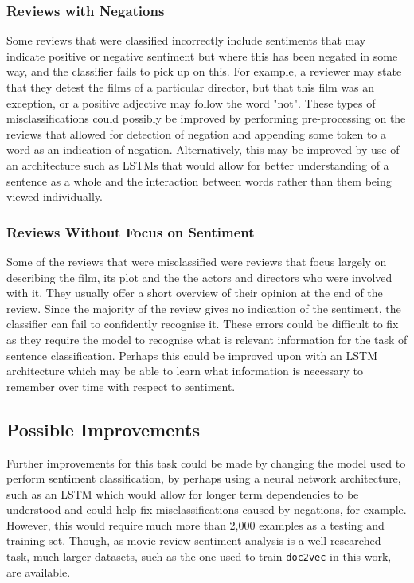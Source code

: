 \documentclass[twocolumn]{article}
\begin{document}
\subsubsection{Reviews with Negations}

Some reviews that were classified incorrectly include sentiments that may indicate positive or negative sentiment but where this has been negated in some way, and the classifier fails to pick up on this. For example, a reviewer may state that they detest the films of a particular director, but that this film was an exception, or a positive adjective may follow the word "not". These types of misclassifications could possibly be improved by performing pre-processing on the reviews that allowed for detection of negation and appending some token to a word as an indication of negation. Alternatively, this may be improved by use of an architecture such as LSTMs that would allow for better understanding of a sentence as a whole and the interaction between words rather than them being viewed individually. 

\subsubsection{Reviews Without Focus on Sentiment}

Some of the reviews that were misclassified were reviews that focus largely on describing the film, its plot and the the actors and directors who were involved with it. They usually offer a short overview of their opinion at the end of the review. Since the majority of the review gives no indication of the sentiment, the classifier can fail to confidently recognise it. These errors could be difficult to fix as they require the model to recognise what is relevant information for the task of sentence classification. Perhaps this could be improved upon with an LSTM architecture which may be able to learn what information is necessary to remember over time with respect to sentiment.

\subsection{Possible Improvements}

Further improvements for this task could be made by changing the model used to perform sentiment classification, by perhaps using a neural network architecture, such as an LSTM which would allow for longer term dependencies to be understood and could help fix misclassifications caused by negations, for example. However, this would require much more than 2,000 examples as a testing and training set. Though, as movie review sentiment analysis is a well-researched task, much larger datasets, such as the one used to train \texttt{doc2vec} in this work, are available.
\end{document}
